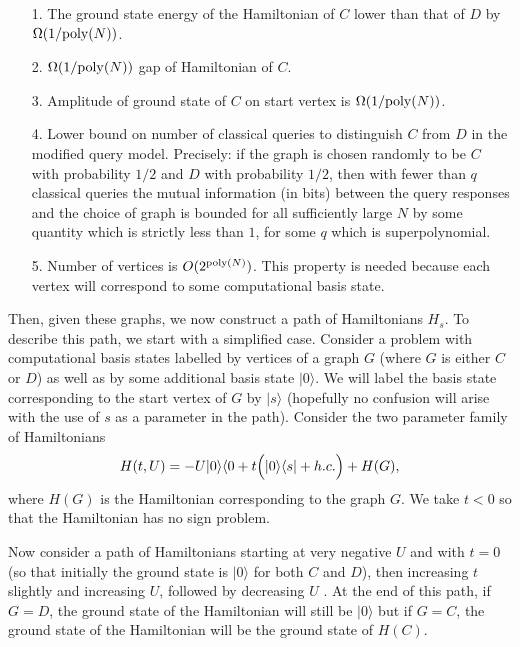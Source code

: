 \documentclass[letterpaper,onecolumn]{quantumarticle}
\newcommand{\be}{\begin{equation}}
\newcommand{\ee}{\end{equation}}
\newcommand{\poly}{{\rm poly}}
\begin{document}
\begin{center}
\begin{itemize}
\item[1.] The ground state energy of the Hamiltonian of $C$ lower than that of $D$ by $\Omega(1/\poly(N))$.

\item[2.] $\Omega(1/\poly(N))$ gap of Hamiltonian of $C$.

\item[3.] Amplitude of ground state of $C$ on start vertex is $\Omega(1/\poly(N))$.

\item[4.] Lower bound on number of classical queries to distinguish $C$ from $D$ in the modified query model.  Precisely: if the graph is chosen randomly to be $C$ with probability $1/2$ and $D$ with probability $1/2$, then with fewer than $q$ classical queries the mutual information (in bits) between the query responses and the choice of graph is bounded for all sufficiently large $N$ by some quantity which is strictly less than $1$, for some $q$ which is superpolynomial.

\item[5.] Number of vertices is $O(2^{\poly(N)})$.  This property is needed because each vertex will correspond to some computational basis state.
\end{itemize}
 \label{trq}
\end{center}


Then, given these graphs, we now construct a path of Hamiltonians $H_s$.  To describe this path, we start with a simplified case.  Consider a problem with computational basis states labelled by vertices of a graph $G$ (where $G$ is either $C$ or $D$) as well as by some additional basis state $|0\rangle$.  We will label the basis state corresponding to the start vertex of $G$ by $|s\rangle$ (hopefully no confusion will arise with the use of $s$ as a parameter in the path).
Consider the two parameter family of Hamiltonians
\be
\label{HtU}
H(t,U)=-U|0\rangle\langle 0+t\Bigl( |0\rangle\langle s| +h.c.\Bigr)+H(G),
\ee
where $H(G)$ is the Hamiltonian corresponding to the graph $G$.
We take $t<0$ so that the Hamiltonian has no sign problem.

Now consider a path of Hamiltonians starting at very negative $U$ and with $t=0$ (so that initially the ground state is $|0\rangle$ for both $C$ and $D$),
 then increasing $t$ slightly and increasing $U$, followed by decreasing $U$ .  At the
end of this path, if $G=D$, the ground state of the Hamiltonian will still be $|0\rangle$ but if $G=C$, the ground state of the Hamiltonian will be the ground state of $H(C)$.
\end{document}
